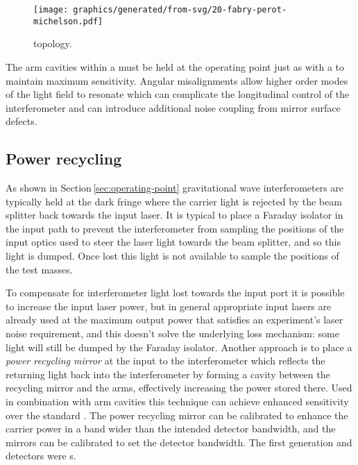 \begin{figure}
  \centering
  \texttt{[image: graphics/generated/from-svg/20-fabry-perot-michelson.pdf]}
  \caption[\FPMI{}]{\label{fig:fpmi}\FPMI{} topology.}
\end{figure}

The arm cavities within a \FPMI{} must be held at the operating point just as with a \MI{} to maintain maximum sensitivity. Angular misalignments allow higher order modes of the light field to resonate which can complicate the longitudinal control of the interferometer and can introduce additional noise coupling from mirror surface defects.

\subsection{\label{sec:power-recycling}Power recycling}
As shown in Section\,\ref{sec:operating-point} gravitational wave interferometers are typically held at the dark fringe where the carrier light is rejected by the beam splitter back towards the input laser. It is typical to place a Faraday isolator in the input path to prevent the interferometer from sampling the positions of the input optics used to steer the laser light towards the beam splitter, and so this light is dumped. Once lost this light is not available to sample the positions of the test masses.

To compensate for interferometer light lost towards the input port it is possible to increase the input laser power, but in general appropriate input lasers are already used at the maximum output power that satisfies an experiment's laser noise requirement, and this doesn't solve the underlying loss mechanism: some light will still be dumped by the Faraday isolator. Another approach is to place a \emph{power recycling mirror} at the input to the interferometer which reflects the returning light back into the interferometer by forming a cavity between the recycling mirror and the arms, effectively increasing the power stored there. Used in combination with \FP{} arm cavities this technique can achieve enhanced sensitivity over the standard \MI{}. The power recycling mirror can be calibrated to enhance the carrier power in a band wider than the intended detector bandwidth, and the \FP{} mirrors can be calibrated to set the detector bandwidth. The first generation \ILIGO{} and \IVIRGO{} detectors were \PRFPMI{}s.

